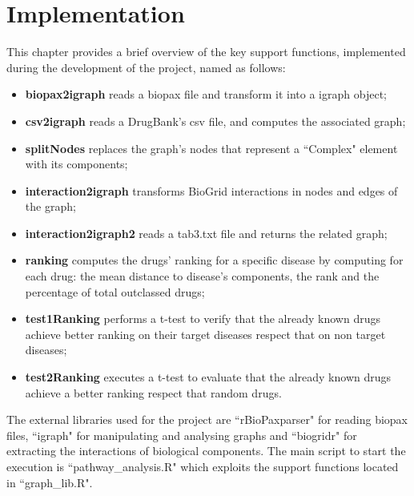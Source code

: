 \chapter{Implementation}\label{chap:implementation}
This chapter provides a brief overview of the key support functions, implemented  during the development of the project, named as follows:

\begin{itemize}
    \item \textbf{biopax2igraph} reads a biopax file and transform it into a igraph object;
    \item \textbf{csv2igraph} reads a DrugBank's csv file, and computes the associated graph;
    \item \textbf{splitNodes} replaces the graph's nodes that represent a ``Complex" element with its components;
    \item \textbf{interaction2igraph} transforms BioGrid\cite{biogrid} interactions in nodes and edges of the graph;
    \item \textbf{interaction2igraph2} reads a tab3.txt file and returns the related graph;
    \item \textbf{ranking} computes the drugs' ranking for a specific disease by computing for each drug: the mean distance to disease's components, the rank and the percentage of total outclassed drugs;
    \item \textbf{test1Ranking} performs a t-test to verify that the already known drugs achieve better ranking on their target diseases respect that on non target diseases;
    \item \textbf{test2Ranking} executes a t-test to evaluate that the already known drugs achieve a better ranking respect that random drugs.
\end{itemize}

The external libraries used for the project are ``rBioPaxparser" for reading biopax files, ``igraph" for manipulating and analysing graphs and ``biogridr" for extracting the interactions of biological components. The main script to start the execution is ``pathway\_analysis.R" which exploits the support functions located in ``graph\_lib.R".